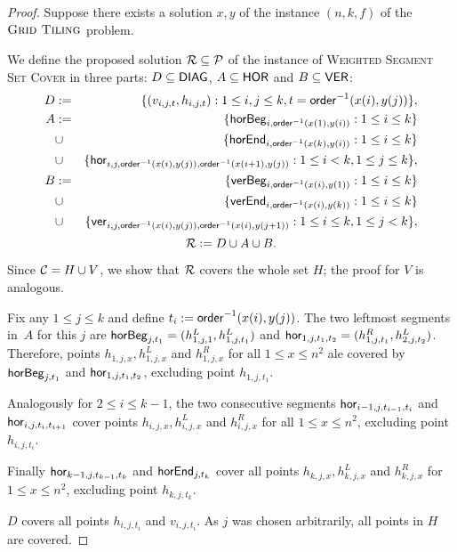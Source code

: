 \begin{proof}
Suppose there exists a solution $x,y$ of the instance $(n,k,f)$
of the $\textsc{Grid Tiling}$ problem.
	
We define the proposed solution $\mathcal{R} \subseteq \mathcal{P}$ of the instance
of \textsc{Weighted} \textsc{Segment} \textsc{Set} \textsc{Cover}
in three parts: $D \subseteq \mathsf{DIAG}$, $A \subseteq \mathsf{HOR}$ and $B \subseteq \mathsf{VER}$:
\begin{eqnarray*}
	D & := & \{(v_{i, j, t}, h_{i, j, t}) : 1 \le i, j \le k, t = \mathsf{order}^{-1}(x(i), y(j))\}, \\
	A & := & \{\mathsf{horBeg}_{i,\mathsf{order}^{-1}(x(1), y(i))} : 1 \le i \le k\} \\
	& \cup & \{\mathsf{horEnd}_{i,\mathsf{order}^{-1}(x(k), y(i))} : 1 \le i \le k\} \\
	& \cup & \{\mathsf{hor}_{i,j,\mathsf{order}^{-1}(x(i), y(j)),\mathsf{order}^{-1}(x(i+1), y(j))} : 1 \le i < k, 1 \le j \le k\}, \\
	B & := & \{\mathsf{verBeg}_{i,\mathsf{order}^{-1}(x(i), y(1))} : 1 \le i \le k\} \\
	& \cup & \{\mathsf{verEnd}_{i,\mathsf{order}^{-1}(x(i), y(k))} : 1 \le i \le k\} \\
	& \cup & \{\mathsf{ver}_{i,j,\mathsf{order}^{-1}(x(i), y(j)),\mathsf{order}^{-1}(x(i), y(j+1))} : 1 \le i \le k, 1 \le j < k\},
\end{eqnarray*}
	$$\mathcal{R} := D \cup A \cup B.$$

Since $\mathcal{C} = H \cup V$, we show that $\mathcal{R}$ covers the whole set $H$;
the proof for $V$ is analogous.

Fix any $1 \le j \le k$ and define $t_{i} := \mathsf{order}^{-1}(x(i), y(j))$.
The two leftmost segments in~$A$ for this $j$ are
$\mathsf{horBeg}_{j,t_1} = (h_{1,j,1}^L, h_{1, j, t_1}^L)$ and
$\mathsf{hor}_{1,j,t_1,t_2} = (h_{1,j, t_1}^R, h_{2,j,t_2}^L)$.
Therefore, points $h_{1,j,x}, h_{1,j,x}^L$ and $h_{1,j,x}^R$
for all $1 \le x \le n^2$ ale covered by $\mathsf{horBeg}_{j,t_1}$ and $\mathsf{hor}_{1,j,t_1,t_2}$,
excluding point $h_{1,j,t_1}$.

Analogously for $2 \le i \le k-1$,
the two consecutive segments $\mathsf{hor}_{i-1,j,t_{i-1},t_i}$
and $\mathsf{hor}_{i,j,t_i,t_{i+1}}$ cover points $h_{i,j,x}, h_{i,j,x}^L$ and $h_{i,j,x}^R$
for all $1 \le x \le n^2$,
excluding point $h_{i,j,t_i}$.

Finally $\mathsf{hor}_{k-1,j,t_{k-1},t_k}$ and $\mathsf{horEnd}_{j,t_k}$
cover all points $h_{k,j,x}, h_{k,j,x}^L$ and $h_{k,j,x}^R$
for ${1 \le x \le n^2}$, excluding point $h_{k,j,t_k}$.

$D$ covers all points $h_{i,j,t_i}$ and $v_{i,j,t_i}$.
As $j$ was chosen arbitrarily, all points in $H$ are covered.


\end{proof}
